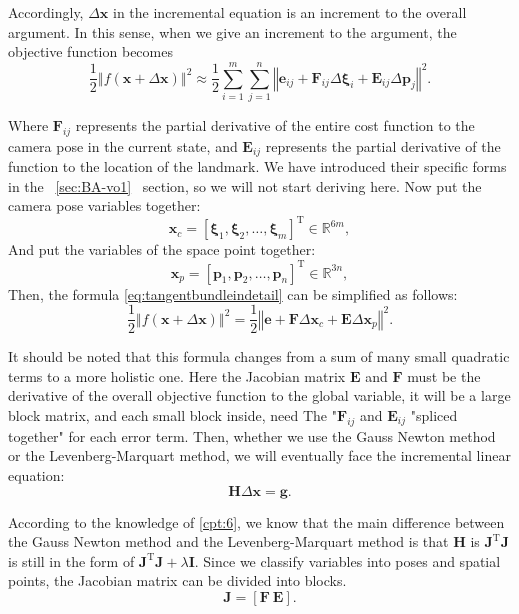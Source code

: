 Accordingly, $\Delta \bm{x}$ in the incremental equation is an increment to the overall argument. In this sense, when we give an increment to the argument, the objective function becomes
\begin{equation}
\label{eq:tangentbundleindetail}
\frac{1}{2}\left\Vert f(\bm{x} + \Delta \bm{x}) \right\Vert ^2 \approx \frac{1}{2}\sum_{i=1}^{m}\sum_{j=1}^n \left\Vert \bm{e}_{ij} + \bm{F}_{ij} \Delta \bm{\xi}_{i} + \bm{E}_{ij} \Delta \bm{p}_j \right\Vert^2 .
\end{equation}

Where $\bm{F}_{ij}$ represents the partial derivative of the entire cost function to the camera pose in the current state, and $\bm{E}_{ij}$ represents the partial derivative of the function to the location of the landmark. We have introduced their specific forms in the ~\ref{sec:BA-vo1}~ section, so we will not start deriving here. Now put the camera pose variables together:
\begin{equation}
\bm{x}_c=[ \bm{\xi}_1, \bm{\xi}_2, \ldots, \bm{\xi}_m ]^\mathrm{T} \in \mathbb{R}^{6m},
\end{equation}
And put the variables of the space point together:
\begin{equation}
\bm{x}_p=[ \bm{p}_1, \bm{p}_2, \ldots , \bm{p}_n ]^\mathrm{T}\in \mathbb{R}^{3n},
\end{equation}
Then, the formula \eqref{eq:tangentbundleindetail} can be simplified as follows:
\begin{equation}
\label{eq:BAleastsquare}
\frac{1}{2}
\left\Vert
f(\bm{x}+ \Delta \bm{x} )
\right\Vert ^2 = 
\frac{1}{2} 
\left\Vert 
\bm{e} + \bm{F}\Delta \bm{x}_c + \bm{E} \Delta \bm{x}_p 
\right \Vert ^2 .
\end{equation}

It should be noted that this formula changes from a sum of many small quadratic terms to a more holistic one. Here the Jacobian matrix $\bm{E}$ and $\bm{F}$ must be the derivative of the overall objective function to the global variable, it will be a large block matrix, and each small block inside, need The "$\bm{F}_{ij}$ and $\bm{E}_{ij}$ "spliced ​​together" for each error term. Then, whether we use the Gauss Newton method or the Levenberg-Marquart method, we will eventually face the incremental linear equation:
\begin{equation}
\bm{H} \Delta \bm{x} = \bm{g}.
\end{equation}

According to the knowledge of \ref{cpt:6}, we know that the main difference between the Gauss Newton method and the Levenberg-Marquart method is that $\bm{H}$ is $\bm{J }^\mathrm{T}\bm{J}$ is still in the form of $\bm{J}^\mathrm{T}\bm{J}+ \lambda \bm{I}$. Since we classify variables into poses and spatial points, the Jacobian matrix can be divided into blocks.
\begin{equation}
\bm{J}=[\bm{F} \ \bm{E}].
\end{equation}

